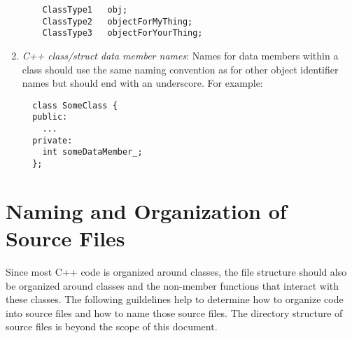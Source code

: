 \begin{enumerate}
\begin{verbatim}
    ClassType1   obj;
    ClassType2   objectForMyThing;
    ClassType3   objectForYourThing;
\end{verbatim}
{}\item\textit{C++ class/struct data member names}: Names for data members
within a class should use the same naming convention as for other object
identifier names but should end with an underscore.  For example:

\begin{verbatim}
  class SomeClass {
  public:
    ...
  private:
    int someDataMember_;
  };
\end{verbatim}

\end{enumerate}

%
\section{Naming and Organization of Source Files}
%

Since most C++ code is organized around classes, the file structure should
also be organized around classes and the non-member functions that interact
with these classes.  The following guildelines help to determine how to
organize code into source files and how to name those source files.  The
directory structure of source files is beyond the scope of this document.

